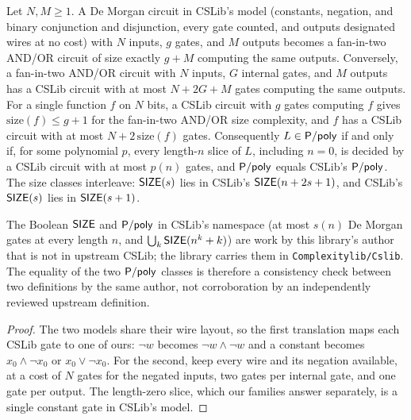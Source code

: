 \begin{theorem}
  \label{thm:circuits-cslib}
  \leanok
  Let $N, M \ge 1$. A De Morgan circuit in CSLib's model (constants,
  negation, and binary conjunction and disjunction, every gate counted, and
  outputs designated wires at no cost) with $N$ inputs, $g$ gates, and $M$
  outputs becomes a fan-in-two AND/OR circuit of size exactly $g + M$
  computing the same outputs. Conversely, a fan-in-two AND/OR circuit with $N$
  inputs, $G$ internal gates, and $M$ outputs has a CSLib circuit with at most
  $N + 2G + M$ gates computing the same outputs. For a single function $f$ on
  $N$ bits, a CSLib circuit with $g$ gates computing $f$ gives
  $\mathrm{size}(f) \le g + 1$ for the fan-in-two AND/OR size complexity, and
  $f$ has a CSLib circuit with at most $N + 2\,\mathrm{size}(f)$ gates.
  Consequently $L \in \mathsf{P/poly}$ if and only if, for some polynomial $p$,
  every length-$n$ slice of $L$, including $n = 0$, is decided by a CSLib
  circuit with at most $p(n)$ gates, and $\mathsf{P/poly}$ equals CSLib's
  $\mathsf{P/poly}$. The size classes interleave: $\mathsf{SIZE}(s)$ lies in
  CSLib's $\mathsf{SIZE}(n + 2s + 1)$, and CSLib's $\mathsf{SIZE}(s)$ lies in
  $\mathsf{SIZE}(s + 1)$.

  The Boolean $\mathsf{SIZE}$ and $\mathsf{P/poly}$ in CSLib's namespace (at most
  $s(n)$ De Morgan gates at every length $n$, and
  $\bigcup_k \mathsf{SIZE}(n^k + k)$) are work by this library's author that is
  not in upstream CSLib; the library carries them in
  \texttt{Complexitylib/Cslib}. The equality of the two
  $\mathsf{P/poly}$ classes is therefore a consistency check between two
  definitions by the same author, not corroboration by an independently
  reviewed upstream definition.
\end{theorem}
\begin{proof}
  \leanok
  The two models share their wire layout, so the first translation maps each
  CSLib gate to one of ours: $\neg w$ becomes $\neg w \wedge \neg w$ and a
  constant becomes $x_0 \wedge \neg x_0$ or $x_0 \vee \neg x_0$. For the second,
  keep every wire and its negation available, at a cost of $N$ gates for the
  negated inputs, two gates per internal gate, and one gate per output. The
  length-zero slice, which our families answer separately, is a single
  constant gate in CSLib's model.
\end{proof}

